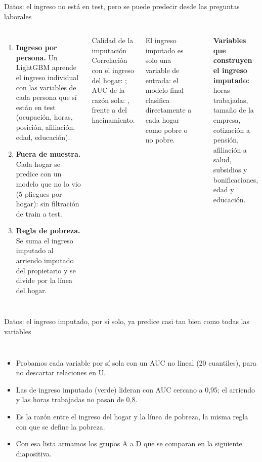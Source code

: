 \begin{frame}{Datos: el ingreso no está en test, pero se puede predecir desde las preguntas laborales}
  \begin{columns}[T]
    \small
    \begin{enumerate}\setlength{\itemsep}{3pt}
      \item \textbf{Ingreso por persona.} Un LightGBM aprende el ingreso individual con las variables de cada persona que sí están en test (ocupación, horas, posición, afiliación, edad, educación).
      \item \textbf{Fuera de muestra.} Cada hogar se predice con un modelo que no lo vio (5 pliegues por hogar): sin filtración de train a test.
      \item \textbf{Regla de pobreza.} Se suma el ingreso imputado al arriendo imputado del propietario y se divide por la línea del hogar.
    \end{enumerate}
    \vspace{2mm}
    \begin{block}{Calidad de la imputación}
      \footnotesize
      Correlación con el ingreso del hogar: \nCorrIng; AUC de la razón sola: \resaltar{\nAUCRazon}, frente a \nAUCHacin{} del hacinamiento.
    \end{block}
    \vspace{1mm}
    {\scriptsize\color{gris}\raggedright El ingreso imputado es solo una variable de entrada: el modelo final clasifica directamente a cada hogar como pobre o no pobre.\par}
    \\[1mm]
    \footnotesize\raggedright
    \textbf{Variables que construyen el ingreso imputado:}\\
    horas trabajadas, tamaño de la empresa, cotización a pensión, afiliación a salud, subsidios y bonificaciones, edad y educación.
  \end{columns}
\end{frame}

\begin{frame}{Datos: el ingreso imputado, por sí solo, ya predice casi tan bien como todas las variables}
  \begin{columns}[T]
    \small
    \begin{itemize}\setlength{\itemsep}{3pt}
      \item Probamos cada variable por sí sola con un AUC no lineal (20 cuantiles), para no descartar relaciones en U.
      \item Las de ingreso imputado (verde) lideran con AUC cercano a 0,95; el arriendo y las horas trabajadas no pasan de 0,8.
      \item Es la razón entre el ingreso del hogar y la línea de pobreza, la misma regla con que se define la pobreza.
      \item Con esa lista armamos los grupos A a D que se comparan en la siguiente diapositiva.
    \end{itemize}
  \end{columns}
\end{frame}

